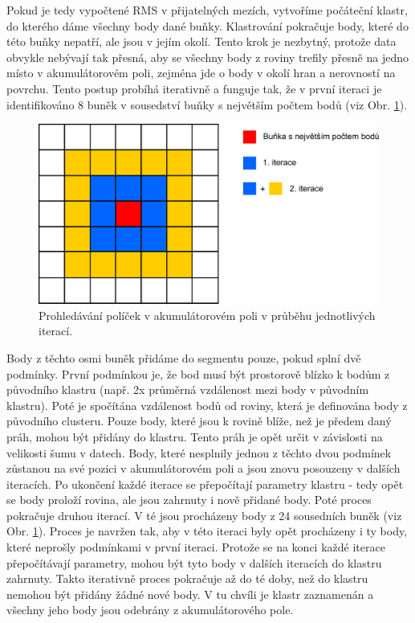 \documentclass[11pt,twoside,a4paper]{book}
\begin{document}
Pokud je tedy vypočtené RMS v přijatelných mezích, vytvoříme počáteční klastr, do kterého dáme všechny body dané buňky. Klastrování pokračuje body, které do této buňky nepatří, ale jsou v jejím okolí. Tento krok je nezbytný, protože data obvykle nebývají tak přesná, aby se všechny body z roviny trefily přesně na jedno místo v akumulátorovém poli, zejména jde o body v okolí hran a nerovností na povrchu. Tento postup probíhá iterativně a funguje tak, že v první iteraci je identifikováno 8 buněk v sousedství buňky s největším počtem bodů (viz Obr. \ref{fig:acc-pole-clus}). 

\begin{figure}[ht]
\begin{center}
\includegraphics[width=12cm]{figures/acc-pole-clustering}
\caption{Prohledávání políček v akumulátorovém poli v průběhu jednotlivých iterací.}
\label{fig:acc-pole-clus}
\end{center}
\end{figure}

\noindent
Body z těchto osmi buněk přidáme do segmentu pouze, pokud splní dvě podmínky. První podmínkou je, že bod musí být prostorově blízko k bodům z původního klastru (např. 2x průměrná vzdálenost mezi body v původním klastru). Poté je spočítána vzdálenost bodů od roviny, která je definována body z původního clusteru. Pouze body, které jsou k rovině blíže, než je předem daný práh, mohou být přidány do klastru. Tento práh je opět určit v závislosti na velikosti šumu v datech.  Body, které nesplnily jednou z těchto dvou podmínek zůstanou na své pozici v akumulátorovém poli a jsou znovu posouzeny v dalších iteracích. Po ukončení každé iterace se přepočítají parametry klastru - tedy opět se body proloží rovina, ale jsou zahrnuty i nově přidané body. Poté proces pokračuje druhou iterací. V té jsou procházeny body z 24 sousedních buněk (viz Obr. \ref{fig:acc-pole-clus}). Proces je navržen tak, aby v této iteraci byly opět procházeny i ty body, které neprošly podmínkami v první iteraci. Protože se na konci každé iterace přepočítávají parametry, mohou být tyto body v dalších iteracích do klastru zahrnuty. Takto iterativně proces pokračuje až do té doby, než do klastru nemohou být přidány žádné nové body. V tu chvíli je klastr zaznamenán a všechny jeho body jsou odebrány z akumulátorového pole.
\end{document}
